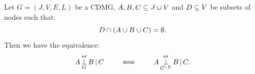 \begin{claimmark}
\begin{Lem}\label{lem:stability_separation_marginalization}
        Let $G=(J,V,E,L)$ be a CDMG, $A,B,C \subseteq J \cup V$ and $D \subseteq V$ 
        be subsets of nodes such that:
        \[ D \cap \left ( A \cup B \cup C\right ) = \emptyset.\]
        Then we have the equivalence:
        \[ A \operatorname*{\perp}^{i\sigma}_G B \operatorname*{|} C \qquad \iff \qquad  A \operatorname*{\perp}^{i\sigma}_{G^{\setminus D} }B \operatorname*{|} C. \]
\end{Lem}
\end{claimmark}



